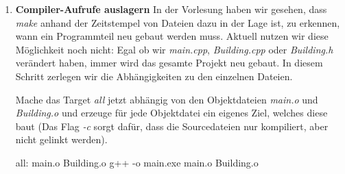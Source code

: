 \documentclass[
  accentcolor=tud1c,	%
  colorbacktitle,		%
  inverttitle,			%
  german,				%
  twoside
]{tudexercise}
\begin{document}
\begin{enumerate}
\begin{minipage}[t]{.45\textwidth}
\begin{lstlisting}
/*
* File: Building.h
*/
#ifndef BUILDING_H_
#define BUILDING_H_

#include <string>

class Building {
public:
    Building(unsigned int numFloors);
    const std::string toString() const;
private:
    unsigned int numFloors;
};
#endif
\end{lstlisting}
\end{minipage}
\begin{minipage}[t]{.45\textwidth}
\begin{lstlisting}
/*
* File: Building.cpp
*/
#include "Building.h"

#include <string>
#include <sstream>

using namespace std;

Building::Building(unsigned int numFloors) :
    numFloors(numFloors) {}

const std::string Building::toString() const{
    stringstream output;
    output << "A building with " 
           << this->numFloors 
           << " floors\n";
    return output.str();
}
\end{lstlisting}
\end{minipage}

Erzeuge in \emph{main} eine zweistöckige Instanz von \emph{Building} und gib diese mittels \emph{Building::toString} auf der Konsole aus.

Damit das Projekt kompiliert, muss auch \emph{Building} im Makefile eingetragen werden.
Passe dazu den Compileraufruf an:
\begin{lstmake}
all:
    g++ -o main.exe main.cpp Building.cpp
\end{lstmake}

Wenn du das Projekt gebaut hast, sollte auf der Konsole eine Ausgabe deines Gebäudes erscheinen.

\item\textbf{Compiler-Aufrufe auslagern}
In der Vorlesung haben wir gesehen, dass \emph{make} anhand der Zeitstempel von Dateien dazu in der Lage ist, zu erkennen, wann ein Programmteil neu gebaut werden muss.
Aktuell nutzen wir diese Möglichkeit noch nicht:
Egal ob wir \emph{main.cpp}, \emph{Building.cpp} oder \emph{Building.h} verändert haben, immer wird das gesamte Projekt neu gebaut.
In diesem Schritt zerlegen wir die Abhängigkeiten zu den einzelnen Dateien.

Mache das Target \emph{all} jetzt abhängig von den Objektdateien \emph{main.o} und \emph{Building.o} und erzeuge für jede Objektdatei ein eigenes Ziel, welches diese baut (Das Flag \emph{-c} sorgt dafür, dass die Sourcedateien nur kompiliert, aber nicht gelinkt werden).
\begin{lstmake}
all: main.o Building.o
	g++ -o main.exe main.o Building.o


\end{lstmake}
\end{enumerate}
\end{document}
